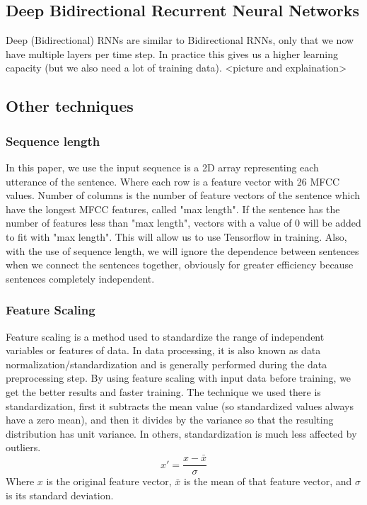 \documentclass[conference]{IEEEtran}
\begin{document}
\subsection{Deep Bidirectional Recurrent Neural Networks}
Deep (Bidirectional) RNNs are similar to Bidirectional RNNs, only that we now have multiple layers per time step. In practice this gives us a higher learning capacity (but we also need a lot of training data).
<picture and explaination>

\subsection{Other techniques}
\subsubsection{Sequence length}

In this paper, we use the input sequence is a 2D array representing each utterance of the sentence. Where each row is a feature vector with 26 MFCC values. Number of columns is the number of feature vectors of the sentence which have the longest MFCC features, called "max length". If the sentence has the number of features less than "max length", vectors with a value of 0 will be added to fit with "max length". This will allow us to use Tensorflow in training. Also, with the use of sequence length, we will ignore the dependence between sentences when we connect the sentences together, obviously for greater efficiency because sentences completely independent.
\subsubsection{Feature Scaling}
Feature scaling is a method used to standardize the range of independent variables or features of data. In data processing, it is also known as data normalization/standardization and is generally performed during the data preprocessing step. By using feature scaling with input data before training, we get the better results and faster training. The technique we used there is standardization, first it subtracts the mean value (so standardized values always have a zero mean), and then it divides by the variance so that the resulting distribution has unit variance. In others, standardization is much less affected by outliers.
\begin{equation}
	x' = \frac{x - \bar{x}}{\sigma}
\end{equation}
Where ${\displaystyle x}$ is the original feature vector, ${\displaystyle {\bar {x}}}$ is the mean of that feature vector, and ${\displaystyle \sigma }$ is its standard deviation.
\end{document}
